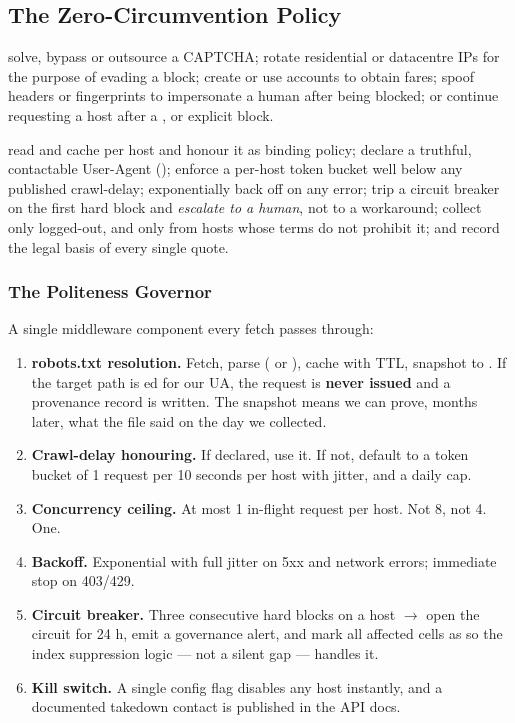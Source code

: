 \subsection{The Zero-Circumvention Policy}
\label{sec:ladder}

\begin{redbox}
 solve, bypass or outsource a CAPTCHA;
rotate residential or datacentre IPs for the purpose of evading a block; create or use
accounts to obtain fares; spoof headers or fingerprints to impersonate a human after being
blocked; or continue requesting a host after a ,  or explicit block.

 read and cache  per host and honour it as binding
policy; declare a truthful, contactable User-Agent
(); enforce a per-host token bucket well below any
published crawl-delay; exponentially back off on any error; trip a circuit breaker on the
first hard block and \emph{escalate to a human}, not to a workaround; collect only
logged-out, and only from hosts whose terms do not prohibit it; and record the legal basis
of every single quote.
\end{redbox}

\subsubsection{The Politeness Governor}

A single middleware component every fetch passes through:

\begin{enumerate}
\item \textbf{robots.txt resolution.} Fetch, parse ( or
), cache with TTL, snapshot to . If the
target path is ed for our UA, the request is \textbf{never issued} and a
 provenance record is written. The snapshot means we can prove, months
later, what the file said on the day we collected.
\item \textbf{Crawl-delay honouring.} If declared, use it. If not, default to a token bucket
of 1 request per 10 seconds per host with jitter, and a daily cap.
\item \textbf{Concurrency ceiling.} At most 1 in-flight request per host. Not 8, not 4. One.
\item \textbf{Backoff.} Exponential with full jitter on 5xx and network errors; immediate
stop on 403/429.
\item \textbf{Circuit breaker.} Three consecutive hard blocks on a host $\to$ open the
circuit for 24 h, emit a governance alert, and mark all affected cells as
 so the index suppression logic --- not a silent gap --- handles it.
\item \textbf{Kill switch.} A single config flag disables any host instantly, and a
documented takedown contact is published in the API docs.
\end{enumerate}


